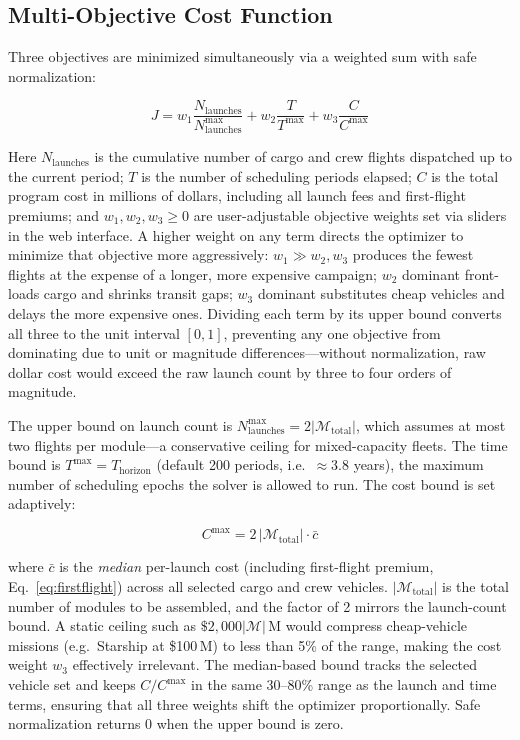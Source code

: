 \subsection{Multi-Objective Cost Function}
\label{sec:cost}

Three objectives are minimized simultaneously via a weighted sum
with safe normalization:

\begin{equation}
  J = w_1 \frac{N_{\mathrm{launches}}}{N_{\mathrm{launches}}^{\max}}
    + w_2 \frac{T}{T^{\max}}
    + w_3 \frac{C}{C^{\max}}
  \label{eq:cost}
\end{equation}

\noindent Here $N_{\mathrm{launches}}$ is the cumulative number of
cargo and crew flights dispatched up to the current period;
$T$ is the number of scheduling periods elapsed;
$C$ is the total program cost in millions of dollars, including all
launch fees and first-flight premiums;
and $w_1, w_2, w_3 \geq 0$ are user-adjustable objective weights
set via sliders in the web interface.
A higher weight on any term directs the optimizer to minimize that
objective more aggressively: $w_1 \gg w_2, w_3$ produces the
fewest flights at the expense of a longer, more expensive
campaign; $w_2$ dominant front-loads cargo and shrinks transit
gaps; $w_3$ dominant substitutes cheap vehicles and delays the
more expensive ones.
Dividing each term by its upper bound converts all three to the
unit interval $[0,1]$, preventing any one objective from dominating
due to unit or magnitude differences---without normalization, raw
dollar cost would exceed the raw launch count by three to four
orders of magnitude.

The upper bound on launch count is
$N_{\mathrm{launches}}^{\max} = 2|\mathcal{M}_{\mathrm{total}}|$,
which assumes at most two flights per module---a conservative
ceiling for mixed-capacity fleets.
The time bound is $T^{\max} = T_{\mathrm{horizon}}$
(default 200 periods, i.e.\ $\approx 3.8$ years), the maximum
number of scheduling epochs the solver is allowed to run.
The cost bound is set adaptively:

\begin{equation}
  C^{\max} = 2\,|\mathcal{M}_{\mathrm{total}}| \cdot \bar{c}
  \label{eq:cmax}
\end{equation}

\noindent where $\bar{c}$ is the \emph{median} per-launch cost
(including first-flight premium, Eq.~\ref{eq:firstflight}) across
all selected cargo and crew vehicles.
$|\mathcal{M}_{\mathrm{total}}|$ is the total number of modules to
be assembled, and the factor of 2 mirrors the launch-count bound.
A static ceiling such as $\$2{,}000|\mathcal{M}|$\,M
would compress cheap-vehicle missions (e.g.\ Starship at \$100\,M)
to less than 5\% of the range, making the cost weight $w_3$
effectively irrelevant.
The median-based bound tracks the selected vehicle set and keeps
$C/C^{\max}$ in the same 30--80\% range as the launch and time
terms, ensuring that all three weights shift the optimizer
proportionally.
Safe normalization returns 0 when the upper bound is zero.

